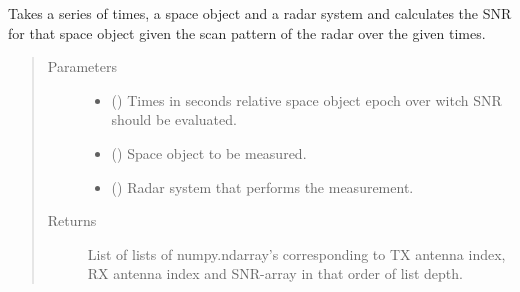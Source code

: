 \documentclass[letterpaper,10pt,english]{sphinxmanual}
\begin{document}
\begin{fulllineitems}
\label{\detokenize{modules/simulate_tracking:simulate_tracking.get_scan_snr}}
Takes a series of times, a space object and a radar system and calculates the SNR for that space object given the scan pattern of the radar over the given times.
\begin{quote}\begin{description}
\item[{Parameters}] \leavevmode\begin{itemize}
\item {} 
 () \textendash{} Times in seconds relative space object epoch over witch SNR should be evaluated.

\item {} 
 ({\hyperref[\detokenize{modules/space_object:space_object.SpaceObject}]{}}) \textendash{} Space object to be measured.

\item {} 
 ({\hyperref[\detokenize{modules/radar_config:radar_config.RadarSystem}]{}}) \textendash{} Radar system that performs the measurement.

\end{itemize}

\item[{Returns}] \leavevmode
List of lists of numpy.ndarray’s corresponding to TX antenna index, RX antenna index and SNR-array in that order of list depth.

\end{description}\end{quote}

\end{fulllineitems}

\end{document}
